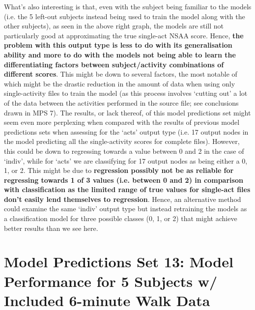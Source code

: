 \documentclass[12pt,twoside]{report}
\begin{document}
\quad What’s also interesting is that, even with the subject being familiar to the models (i.e. the 5 left-out subjects instead being used to train the model along with the other subjects), as seen in the above right graph, the models are still not particularly good at approximating the true single-act NSAA score. Hence, \textbf{the problem with this output type is less to do with its generalisation ability and more to do with the models not being able to learn the differentiating factors between subject/activity combinations of different scores}. This might be down to several factors, the most notable of which might be the drastic reduction in the amount of data when using only single-activity files to train the model (as this process involves ‘cutting out’ a lot of the data between the activities performed in the source file; see conclusions drawn in MPS 7). The results, or lack thereof, of this model predictions set might seem even more perplexing when compared with the results of previous model predictions sets when assessing for the ‘acts’ output type (i.e. 17 output nodes in the model predicting all the single-activity scores for complete files). However, this could be down to regressing towards a value between 0 and 2 in the case of ‘indiv’, while for ‘acts’ we are classifying for 17 output nodes as being either a 0, 1, or 2. This might be due to \textbf{regression possibly not be as reliable for regressing towards 1 of 3 values (i.e. between 0 and 2) in comparison with classification as the limited range of true values for single-act files don’t easily lend themselves to regression}. Hence, an alternative method could examine the same ‘indiv’ output type but instead retraining the models as a classification model for three possible classes (0, 1, or 2) that might achieve better results than we see here.





\section{Model Predictions Set 13: Model Performance for 5 Subjects w/ Included 6-minute Walk Data}
\end{document}
